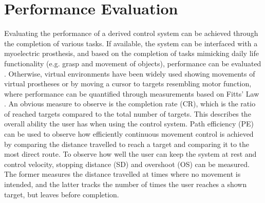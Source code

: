 \section{Performance Evaluation}

Evaluating the performance of a derived control system can be achieved through the completion of various tasks. If available, the system can be interfaced with a myoelectric prosthesis, and based on the completion of tasks mimicking daily life functionality (e.g. grasp and movement of objects), performance can be evaluated \cite{Mastinu2018}. Otherwise, virtual environments have been widely used showing movements of virtual prostheses \cite{Powell2014} or by moving a cursor to targets resembling motor function, where performance can be quantified through measurements based on Fitts' Law \cite{Scheme2013,Wurth2014,Hahne2014}. An obvious measure to observe is the completion rate (CR), which is the ratio of reached targets compared to the total number of targets. This describes the overall ability the user has when using the control system. Path efficiency (PE) can be used to observe how efficiently continuous movement control is achieved by comparing the distance travelled to reach a target and comparing it to the most direct route. To observe how well the user can keep the system at rest and control velocity, stopping distance (SD) and overshoot (OS) can be measured. The former measures the distance travelled at times where no movement is intended, and the latter tracks the number of times the user reaches a shown target, but leaves before completion. \cite{Scheme2013}
